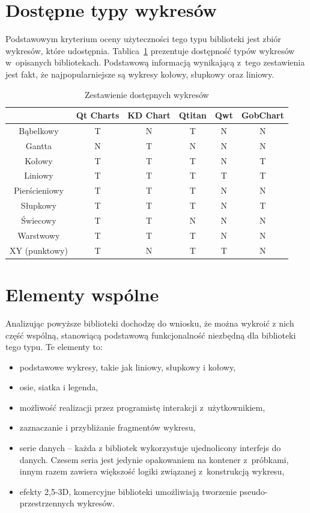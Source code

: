 \section{Dostępne typy wykresów}
Podstawowym kryterium oceny użyteczności tego typu biblioteki jest zbiór wykresów, które udostępnia. Tablica~\ref{tab:wykresy} prezentuje dostępność typów wykresów w~opisanych bibliotekach. Podstawową informacją wynikającą z~tego zestawienia jest fakt, że najpopularniejsze są wykresy kołowy, słupkowy oraz liniowy.
\begin{table}[h]\footnotesize
\centering
\caption{Zestawienie dostępnych wykresów}
\label{tab:wykresy}
\begin{tabular}{|c|c|c|c|c|c|}
\hline
&  Qt Charts & KD Chart & Qtitan & Qwt & GobChart\\
\hline
Bąbelkowy & T & N & T & N & N\\
\hline
Gantta & N & T & N & N & N\\
\hline
Kołowy & T & T & T & N & T\\
\hline
Liniowy & T & T & T & T & T\\
\hline
Pierścieniowy & T & T & T & N & N\\
\hline
Słupkowy & T & T & T & N & T\\
\hline
Świecowy & T & T & N & N & N\\
\hline
Warstwowy & T & T & T & N & N\\
\hline
XY (punktowy) & T & N & T & T & N\\
\hline
\end{tabular}
\end{table}


\section{Elementy wspólne}
Analizując powyższe biblioteki dochodzę do wniosku, że można wykroić z nich część wspólną, stanowiącą podstawową funkcjonalność niezbędną dla biblioteki tego typu. Te elementy to:
\begin{itemize}
\item{podstawowe wykresy, takie jak liniowy, słupkowy i kołowy,}
\item{osie, siatka i legenda,}
\item{możliwość realizacji przez programistę interakcji z~użytkownikiem,}
\item{zaznaczanie i przybliżanie fragmentów wykresu,}
\item{serie danych -- każda z bibliotek wykorzystuje ujednolicony interfejs do danych. Czesem seria jest jedynie opakowaniem na kontener z~próbkami, innym razem zawiera większość logiki związanej z~konstrukcją wykresu,}
\item{efekty 2,5-3D, komercyjne biblioteki umożliwiają tworzenie pseudo-przestrzennych wykresów.}
\end{itemize}

